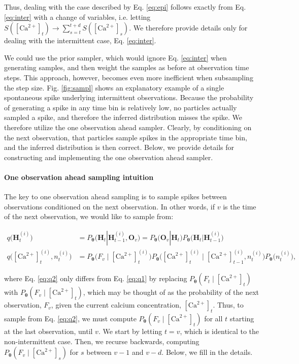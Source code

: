 \documentclass[12pt]{article}
\providecommand{\ve}[1]{\boldsymbol{#1}}
\providecommand{\ve}[1]{\boldsymbol{#1}}
\newcommand{\thetn}{\ve{\theta}}
\newcommand{\p}{P_{\thetn}}
\newcommand{\q}{q\big(\ve{H}_t^{(i)}\big)}
\newcommand{\Ca}{[\text{Ca}^{2+}]}
\begin{document}
\noindent Thus, dealing with the case described by Eq. \ref{eq:epi} follows exactly from Eq. \ref{eq:inter} with a change of variables, i.e. letting $S(\Ca_t) \rightarrow \sum_{s=t}^{t+d} S(\Ca_s)$.  We therefore provide details only for dealing with the intermittent case, Eq. \ref{eq:inter}. 

We could use the prior sampler, which would ignore Eq. \ref{eq:inter} when generating samples, and then weight the samples as before at observation time steps.  This approach, however, becomes even more inefficient when subsampling the step size.  Fig. \ref{fig:sampl} shows an explanatory example of a single spontaneous spike underlying intermittent observations. Because the probability of generating a spike in any time bin is relatively low, no particles actually sampled a spike, and therefore the inferred distribution misses the spike. We therefore utilize the one observation ahead sampler. Clearly, by conditioning on the next observation, that particles sample spikes in the appropriate time bin, and the inferred distribution is then correct. Below, we provide details for constructing and implementing the one observation ahead sampler.

\paragraph{One observation ahead sampling intuition}

The key to one observation ahead sampling is to sample spikes between observations conditioned on the next observation.  In other words, if $v$ is the time of the next observation, we would like to sample from:

\begin{align} \label{eq:q2}
\q &= \p\big(\ve{H}_t | \ve{H}_{t-1}^{(i)}, \ve{O}_v\big) %
= \p\big(\ve{O}_v | \ve{H}_t\big) \p\big(\ve{H}_t | \ve{H}_{t-1}^{(i)}\big) \nonumber \\ 
q\big(\Ca_t^{(i)}, n_t^{(i)}\big) &=  \p\big(F_v \mid \Ca_t^{(i)}\big)  \p\big(\Ca_t^{(i)} \mid \Ca_{t-1}^{(i)}, n_t^{(i)}\big) \p\big(n_t^{(i)}\big),
\end{align}

\noindent where Eq. \ref{eq:q2} only differs from Eq. \ref{eq:q1} by replacing $\p(F_t \mid \Ca_t)$ with $\p(F_v \mid \Ca_t)$, which may be thought of as the probability of the next observation, $F_v$, given the current calcium concentration, $\Ca_t$.  Thus, to sample from Eq. \ref{eq:q2}, we must compute $\p(F_v \mid \Ca_t)$ for all $t$ starting at the last observation, until $v$.  We start by letting $t=v$, which is identical to the non-intermittent case.  Then, we recurse backwards, computing $\p(F_v \mid \Ca_s)$ for $s$ between $v-1$ and $v-d$. Below, we fill in the details.  
\end{document}
